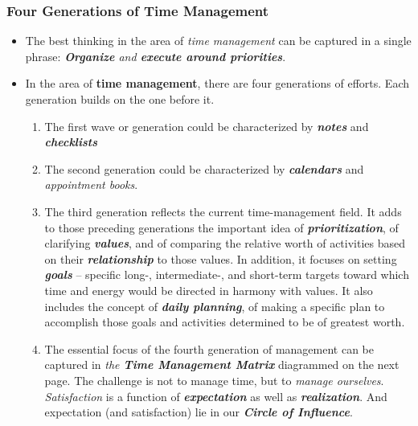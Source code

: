 \documentclass[11pt]{article}
\begin{document}
\subsubsection{Four Generations of Time Management}
\begin{itemize}
\item The best thinking in the area of \emph{time management} can be captured in a single phrase: \emph{\textbf{Organize} and \textbf{execute around priorities}}. 

\item In the area of \textbf{time management}, there are four generations of efforts. Each generation builds on the one before it.
\begin{enumerate}
\item The first wave or generation could be characterized by \emph{\textbf{notes}} and \emph{\textbf{checklists}}
\item The second generation could be characterized by \emph{\textbf{calendars}} and \emph{appointment books}.\
\item The third generation reflects the current time-management field. It adds to those preceding generations the important idea of \emph{\textbf{prioritization}}, of clarifying \emph{\textbf{values}}, and of comparing the relative worth of activities based on their \emph{\textbf{relationship}} to those values. In addition, it focuses on setting \emph{\textbf{goals}} -- specific long-, intermediate-, and short-term targets toward which time and energy would be directed in harmony with values. It also includes the concept of \emph{\textbf{daily planning}}, of making a specific plan to accomplish those goals and activities determined to be of greatest worth.
\item The essential focus of the fourth generation of management can be captured in \emph{the \textbf{Time Management Matrix}} diagrammed on the next page. The challenge is not to manage time, but to \emph{manage ourselves}. \emph{Satisfaction} is a function of \emph{\textbf{expectation}} as well as \emph{\textbf{realization}}. And expectation (and satisfaction) lie in our \emph{\textbf{Circle of Influence}}.
\end{enumerate}
\end{itemize}
\end{document}
